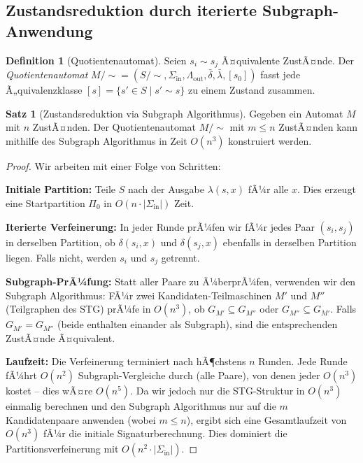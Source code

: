 ﻿\documentclass[a4paper,12pt]{article}
\theoremstyle{definition}
\newtheorem{definition}{Definition}
\newtheorem{satz}{Satz}
\begin{document}
\subsection{Zustandsreduktion durch iterierte Subgraph-Anwendung}

\begin{definition}[Quotientenautomat]
  Seien $s_i \sim s_j$ Ã¤quivalente ZustÃ¤nde. Der \emph{Quotientenautomat}
  $M/{\sim} = (S/{\sim}, \Sigma_{\text{in}}, \Lambda_{\text{out}}, \bar\delta, \bar\lambda, [s_0])$
  fasst jede Ã„quivalenzklasse $[s] = \{s' \in S \mid s' \sim s\}$ zu einem Zustand zusammen.
\end{definition}

\begin{satz}[Zustandsreduktion via Subgraph Algorithmus]
  Gegeben ein Automat $M$ mit $n$ ZustÃ¤nden. Der Quotientenautomat $M/\!\sim$ mit
  $m \leq n$ ZustÃ¤nden kann mithilfe des Subgraph Algorithmus in Zeit $O(n^3)$ konstruiert
  werden.
\end{satz}

\begin{proof}
  Wir arbeiten mit einer Folge von Schritten:

  \textbf{Initiale Partition:} Teile $S$ nach der Ausgabe $\lambda(s, x)$ fÃ¼r alle $x$.
  Dies erzeugt eine Startpartition $\Pi_0$ in $O(n \cdot |\Sigma_{\text{in}}|)$ Zeit.

  \textbf{Iterierte Verfeinerung:} In jeder Runde prÃ¼fen wir fÃ¼r jedes Paar $(s_i, s_j)$
  in derselben Partition, ob $\delta(s_i, x)$ und $\delta(s_j, x)$ ebenfalls in derselben
  Partition liegen. Falls nicht, werden $s_i$ und $s_j$ getrennt.

  \textbf{Subgraph-PrÃ¼fung:} Statt aller Paare zu Ã¼berprÃ¼fen, verwenden wir den Subgraph
  Algorithmus: FÃ¼r zwei Kandidaten-Teilmaschinen $M'$ und $M''$ (Teilgraphen des STG)
  prÃ¼fe in $O(n^3)$, ob $G_{M'} \subseteq G_{M''}$ oder $G_{M''} \subseteq G_{M'}$.
  Falls $G_{M'} = G_{M''}$ (beide enthalten einander als Subgraph), sind die
  entsprechenden ZustÃ¤nde Ã¤quivalent.

  \textbf{Laufzeit:} Die Verfeinerung terminiert nach hÃ¶chstens $n$ Runden. Jede Runde
  fÃ¼hrt $O(n^2)$ Subgraph-Vergleiche durch (alle Paare), von denen jeder $O(n^3)$
  kostet -- dies wÃ¤re $O(n^5)$. Da wir jedoch nur die STG-Struktur in $O(n^3)$ einmalig
  berechnen und den Subgraph Algorithmus nur auf die $m$ Kandidatenpaare anwenden
  (wobei $m \leq n$), ergibt sich eine Gesamtlaufzeit von $O(n^3)$ fÃ¼r die
  initiale Signaturberechnung. Dies dominiert die Partitionsverfeinerung mit
  $O(n^2 \cdot |\Sigma_{\text{in}}|)$.
\end{proof}
\end{document}
